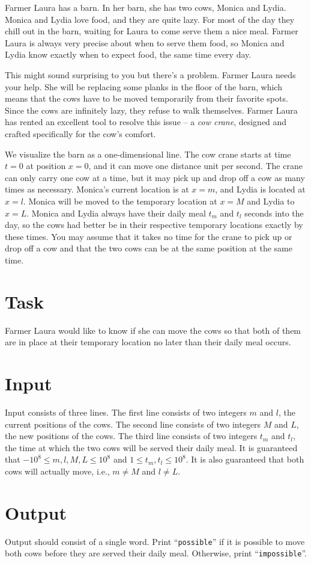 

Farmer Laura has a barn. In her barn, she has two cows, Monica and Lydia. Monica and Lydia love
food, and they are quite lazy. For most of the day they chill out in the
barn, waiting for Laura to come serve them a nice meal. Farmer Laura is always very precise about
when to serve them food, so Monica and Lydia know exactly when to expect food, the same time every
day.

This might sound surprising to you but there's a problem. Farmer Laura needs your help. She
will be replacing some planks in the floor of the barn, which means that the cows have to 
be moved temporarily from their favorite spots. Since the cows are infinitely
lazy, they refuse to walk themselves. Farmer Laura has rented an
excellent tool to resolve this issue -- a \emph{cow crane}, designed and crafted
specifically for the cow's comfort.

We visualize the barn as a one-dimensional line. The cow crane starts at time $t = 0$ at position $x = 0$, 
and it can move one distance unit per second. The crane can only carry one cow
at a time, but it may pick up and drop off a cow as many times as necessary.
Monica's current location is at $x = m$, and Lydia is located at $x = l$.
Monica will be moved to the temporary location at $x = M$ and Lydia to 
$x = L$. Monica and Lydia always have their daily meal $t_m$ and $t_l$ seconds
into the day, so the cows had better be in their respective temporary locations exactly by these times. You
may assume that it takes no time for the crane to pick up or drop off a cow and that the two cows
can be at the same position at the same time.

\section*{Task}
Farmer Laura would like to know if she can move the cows so that both of them are in place at their
temporary location no later than their daily meal occurs.

\section*{Input}
Input consists of three lines. The first line consists of two integers $m$ and
$l$, the current positions of the cows. The second line consists of two integers
$M$ and $L$, the new positions of the cows. The third line consists of two integers
$t_m$ and $t_l$, the time at which the two cows will be served their daily meal.
It is guaranteed that $-10^8 \leq m, l, M, L \leq 10^8$ and $1
\leq t_m, t_l \leq 10^8$. It is also guaranteed that both cows will actually move, i.e., $m \not= M$ and $l \not= L$.

\section*{Output}
Output should consist of a single word.  Print ``\texttt{possible}'' if it is possible to move both cows before
they are served their daily meal. Otherwise, print ``\texttt{impossible}''.
